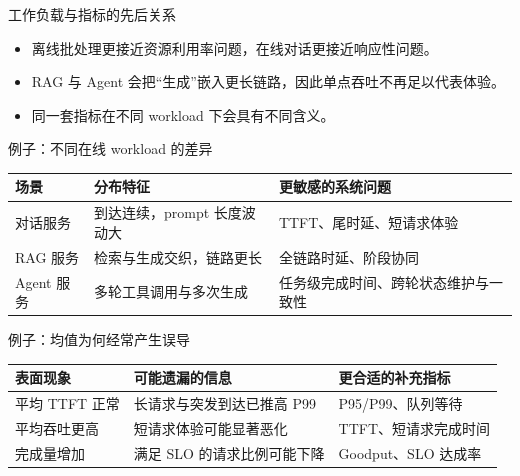 \begin{frame}{工作负载与指标的先后关系}
  \begin{itemize}
    \item 离线批处理更接近资源利用率问题，在线对话更接近响应性问题。
    \item RAG 与 Agent 会把“生成”嵌入更长链路，因此单点吞吐不再足以代表体验。
    \item 同一套指标在不同 workload 下会具有不同含义。
  \end{itemize}
\end{frame}

\begin{frame}{例子：不同在线 workload 的差异}
  \small
  \begin{tabular}{p{}p{}p{}}
    \toprule
    场景 & 分布特征 & 更敏感的系统问题 \\
    \midrule
    对话服务 & 到达连续，prompt 长度波动大 & TTFT、尾时延、短请求体验 \\
    RAG 服务 & 检索与生成交织，链路更长 & 全链路时延、阶段协同 \\
    Agent 服务 & 多轮工具调用与多次生成 & 任务级完成时间、跨轮状态维护与一致性 \\
    \bottomrule
  \end{tabular}
\end{frame}

\begin{frame}{例子：均值为何经常产生误导}
  \begin{tabular}{p{}p{}p{}}
    \toprule
    表面现象 & 可能遗漏的信息 & 更合适的补充指标 \\
    \midrule
    平均 TTFT 正常 & 长请求与突发到达已推高 P99 & P95/P99、队列等待 \\
    平均吞吐更高 & 短请求体验可能显著恶化 & TTFT、短请求完成时间 \\
    完成量增加 & 满足 SLO 的请求比例可能下降 & Goodput、SLO 达成率 \\
    \bottomrule
  \end{tabular}
\end{frame}

